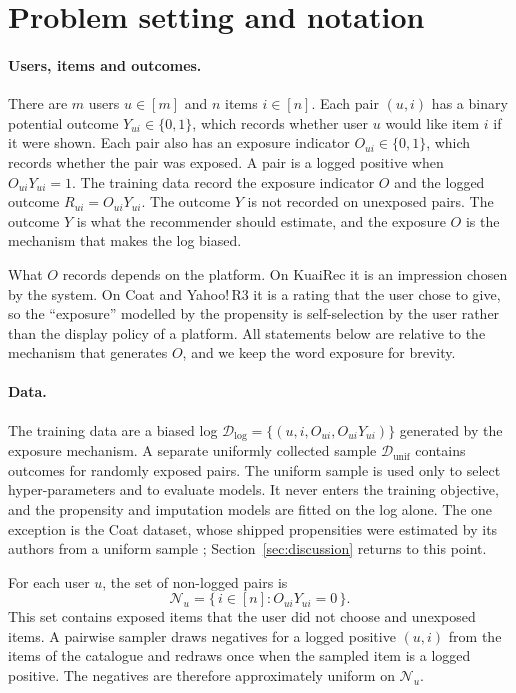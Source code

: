 \section{Problem setting and notation}\label{sec:setting}

\paragraph{Users, items and outcomes.}
There are $m$ users $u\in[m]$ and $n$ items $i\in[n]$. Each pair $(u,i)$ has a binary
potential outcome $Y_{ui}\in\{0,1\}$, which records whether user $u$ would like item
$i$ if it were shown. Each pair also has an exposure indicator $O_{ui}\in\{0,1\}$,
which records whether the pair was exposed. A pair is a logged positive when
$O_{ui}Y_{ui}=1$. The training data record the exposure indicator $O$ and the logged
outcome $R_{ui}=O_{ui}Y_{ui}$. The outcome $Y$ is not recorded on unexposed pairs. The
outcome $Y$ is what the recommender should estimate, and the exposure $O$ is the
mechanism that makes the log biased.

What $O$ records depends on the platform. On KuaiRec it is an impression chosen by the
system. On Coat and Yahoo!\,R3 it is a rating that the user chose to give, so the
``exposure'' modelled by the propensity is self-selection by the user rather than the
display policy of a platform. All statements below are relative to the mechanism that
generates $O$, and we keep the word exposure for brevity.

\paragraph{Data.}
The training data are a biased log $\mathcal D_{\mathrm{log}}=\{(u,i,O_{ui},O_{ui}Y_{ui})\}$
generated by the exposure mechanism. A separate uniformly collected sample
$\mathcal D_{\mathrm{unif}}$ contains outcomes for randomly exposed pairs. The uniform
sample is used only to select hyper-parameters and to evaluate models. It never enters
the training objective, and the propensity and imputation models are fitted on the log
alone. The one exception is the Coat dataset, whose shipped propensities were estimated
by its authors from a uniform sample \citep{schnabel2016}; Section~\ref{sec:discussion} returns to this point.

For each user $u$, the set of non-logged pairs is
\[
\mathcal N_u=\{\,i\in[n] : O_{ui}Y_{ui}=0\,\}.
\]
This set contains exposed items that the user did not choose and unexposed items. A
pairwise sampler draws negatives for a logged positive $(u,i)$ from the items of the
catalogue and redraws once when the sampled item is a logged positive. The negatives
are therefore approximately uniform on $\mathcal N_u$.

